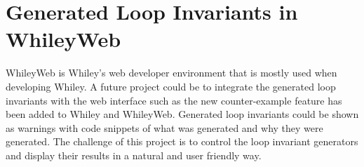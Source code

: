 \section{Generated Loop Invariants in WhileyWeb}

WhileyWeb is Whiley's web developer environment that is mostly used when
developing Whiley.
A future project could be to integrate the generated loop invariants with
the web interface such as the new counter-example feature has been added to
Whiley and WhileyWeb.
Generated loop invariants could be shown as warnings with code snippets of what
was generated and why they were generated.
The challenge of this project is to control the loop invariant
generators and display their results in a natural and user friendly way.
